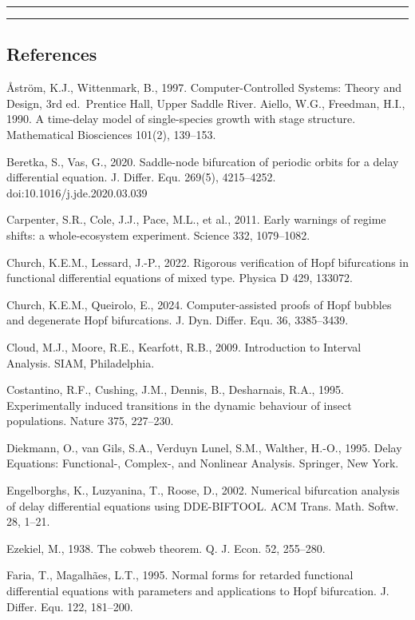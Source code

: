 \documentclass[11pt]{article}
\begin{document}
\begin{center}\rule{0.5\linewidth}{0.5pt}\end{center}

\begin{center}\rule{0.5\linewidth}{0.5pt}\end{center}

\subsection{References}\label{references}

\AA{}str\"om, K.J., Wittenmark, B., 1997. Computer-Controlled Systems: Theory
and Design, 3rd ed.~Prentice Hall, Upper Saddle River. Aiello, W.G.,
Freedman, H.I., 1990. A time-delay model of single-species growth with
stage structure. Mathematical Biosciences 101(2), 139--153.

Beretka, S., Vas, G., 2020. Saddle-node bifurcation of periodic orbits
for a delay differential equation. J. Differ. Equ. 269(5), 4215--4252.
doi:10.1016/j.jde.2020.03.039

Carpenter, S.R., Cole, J.J., Pace, M.L., et al., 2011. Early warnings of
regime shifts: a whole-ecosystem experiment. Science 332, 1079--1082.

Church, K.E.M., Lessard, J.-P., 2022. Rigorous verification of Hopf
bifurcations in functional differential equations of mixed type. Physica
D 429, 133072.

Church, K.E.M., Queirolo, E., 2024. Computer-assisted proofs of Hopf
bubbles and degenerate Hopf bifurcations. J. Dyn. Differ. Equ. 36,
3385--3439.

Cloud, M.J., Moore, R.E., Kearfott, R.B., 2009. Introduction to Interval
Analysis. SIAM, Philadelphia.

Costantino, R.F., Cushing, J.M., Dennis, B., Desharnais, R.A., 1995.
Experimentally induced transitions in the dynamic behaviour of insect
populations. Nature 375, 227--230.

Diekmann, O., van Gils, S.A., Verduyn Lunel, S.M., Walther, H.-O., 1995.
Delay Equations: Functional-, Complex-, and Nonlinear Analysis.
Springer, New York.

Engelborghs, K., Luzyanina, T., Roose, D., 2002. Numerical bifurcation
analysis of delay differential equations using DDE-BIFTOOL. ACM Trans.
Math. Softw. 28, 1--21.

Ezekiel, M., 1938. The cobweb theorem. Q. J. Econ. 52, 255--280.

Faria, T., Magalh\~aes, L.T., 1995. Normal forms for retarded functional
differential equations with parameters and applications to Hopf
bifurcation. J. Differ. Equ. 122, 181--200.
\end{document}
